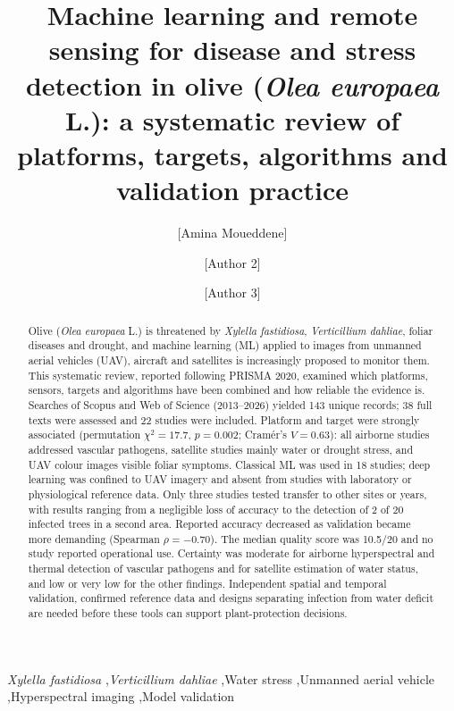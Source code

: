 \documentclass[preprint,12pt]{elsarticle}
\begin{document}
\begin{frontmatter}

\title{Machine learning and remote sensing for disease and stress detection in olive (\textit{Olea europaea} L.): a systematic review of platforms, targets, algorithms and validation practice}

\author[aff1]{[Amina Moueddene]}
\author[aff1]{[Author 2]}
\author[aff1]{[Author 3]}

\begin{abstract}
Olive (\textit{Olea europaea} L.) is threatened by \textit{Xylella fastidiosa}, \textit{Verticillium dahliae}, foliar diseases and drought, and machine learning (ML) applied to images from unmanned aerial vehicles (UAV), aircraft and satellites is increasingly proposed to monitor them. This systematic review, reported following PRISMA 2020, examined which platforms, sensors, targets and algorithms have been combined and how reliable the evidence is. Searches of Scopus and Web of Science (2013--2026) yielded 143 unique records; 38 full texts were assessed and 22 studies were included. Platform and target were strongly associated (permutation $\chi^2=17.7$, $p=0.002$; Cram\'er's $V=0.63$): all airborne studies addressed vascular pathogens, satellite studies mainly water or drought stress, and UAV colour images visible foliar symptoms. Classical ML was used in 18 studies; deep learning was confined to UAV imagery and absent from studies with laboratory or physiological reference data. Only three studies tested transfer to other sites or years, with results ranging from a negligible loss of accuracy to the detection of 2 of 20 infected trees in a second area. Reported accuracy decreased as validation became more demanding (Spearman $\rho=-0.70$). The median quality score was 10.5/20 and no study reported operational use. Certainty was moderate for airborne hyperspectral and thermal detection of vascular pathogens and for satellite estimation of water status, and low or very low for the other findings. Independent spatial and temporal validation, confirmed reference data and designs separating infection from water deficit are needed before these tools can support plant-protection decisions.
\end{abstract}

\begin{keyword}
\textit{Xylella fastidiosa} \sep \textit{Verticillium dahliae} \sep Water stress \sep Unmanned aerial vehicle \sep Hyperspectral imaging \sep Model validation
\end{keyword}

\end{frontmatter}
\end{document}
